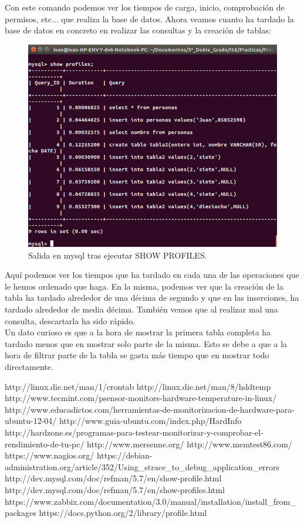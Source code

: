 \begin{itemize}
	Con este comando podemos ver los tiempos de carga, inicio, comprobación de permisos, etc... que realiza la base de datos. Ahora veamos cuanto ha tardado la base de datos en concreto en realizar las consultas y la creación de tablas:\\
	\begin{figure}[H]
	\centering
	\includegraphics[width=0.7\linewidth]{mysqlProfiles}
	\caption[mysqlProfiles]{Salida en mysql tras ejecutar SHOW PROFILES.}
	\label{fig:mysqlProfiles}
	\end{figure}
	Aquí podemos ver los tiempos que ha tardado en cada una de las operaciones que le hemos ordenado que haga. En la misma, podemos ver que la creación de la tabla ha tardado alrededor de una décima de segundo y que en las inserciones, ha tardado alrededor de media décima. También vemos que al realizar mal una consulta, descartarla ha sido rápido. \\
	
	Un dato curioso es que a la hora de mostrar la primera tabla completa  ha tardado menos que en mostrar solo parte de la misma. Esto se debe a que a la hora de filtrar parte de la tabla se gasta más tiempo que en mostrar todo directamente.

\end{itemize}
\newpage
\begin{thebibliography}{xx}
	 http://linux.die.net/man/1/crontab
	 http://linux.die.net/man/8/hddtemp
	 http://www.tecmint.com/psensor-monitors-hardware-temperature-in-linux/
	 http://www.educadictos.com/herramientas-de-monitorizacion-de-hardware-para-ubuntu-12-04/
	 http://www.guia-ubuntu.com/index.php/HardInfo
	 http://hardzone.es/programas-para-testear-monitorizar-y-comprobar-el-rendimiento-de-tu-pc/
	 http://www.mersenne.org/
	 http://www.memtest86.com/
	 https://www.nagios.org/
	 https://debian-administration.org/article/352/Using\_strace\_to\_debug\_application\_errors
	 http://dev.mysql.com/doc/refman/5.7/en/show-profile.html
	 http://dev.mysql.com/doc/refman/5.7/en/show-profiles.html
	 https://www.zabbix.com/documentation/3.0/manual/installation/install\_from\_packages
	 https://docs.python.org/2/library/profile.html
	
\end{thebibliography}
